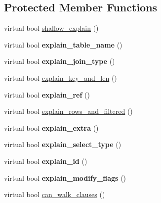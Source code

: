 \subsection*{Protected Member Functions}
\begin{DoxyCompactItemize}
\item 
virtual bool \mbox{\hyperlink{classExplain__join_aa8ce397a394026c9065ffbfb0d624d75}{shallow\+\_\+explain}} ()
\item 
\mbox{\label{classExplain__join_aafb4747a76abccb3142d02f48f44b080}} 
virtual bool {\bfseries explain\+\_\+table\+\_\+name} ()
\item 
\mbox{\label{classExplain__join_aa093ae6a3172e8a462b65398a7020e69}} 
virtual bool {\bfseries explain\+\_\+join\+\_\+type} ()
\item 
virtual bool \mbox{\hyperlink{classExplain__join_a1f6b913e82a260fe431e3faa4dbfa68a}{explain\+\_\+key\+\_\+and\+\_\+len}} ()
\item 
\mbox{\label{classExplain__join_a2055f74c28c776c15a9d829f324eb022}} 
virtual bool {\bfseries explain\+\_\+ref} ()
\item 
virtual bool \mbox{\hyperlink{classExplain__join_a407564ac2ce390da3f0edd30eb3b4a06}{explain\+\_\+rows\+\_\+and\+\_\+filtered}} ()
\item 
\mbox{\label{classExplain__join_a6df925462cd3e56aa0d489b17956bb9a}} 
virtual bool {\bfseries explain\+\_\+extra} ()
\item 
\mbox{\label{classExplain__join_a69c3858ccca814fcd263cd1fe345f1e3}} 
virtual bool {\bfseries explain\+\_\+select\+\_\+type} ()
\item 
\mbox{\label{classExplain__join_ade64e3bc5d2f8728cd1988e1bc27b743}} 
virtual bool {\bfseries explain\+\_\+id} ()
\item 
\mbox{\label{classExplain__join_aeb741da394dbbb0f4f53e14ab89c9598}} 
virtual bool {\bfseries explain\+\_\+modify\+\_\+flags} ()
\item 
virtual bool \mbox{\hyperlink{classExplain__join_a1efc6984153eb72810c7e960f9855dac}{can\+\_\+walk\+\_\+clauses}} ()
\end{DoxyCompactItemize}

